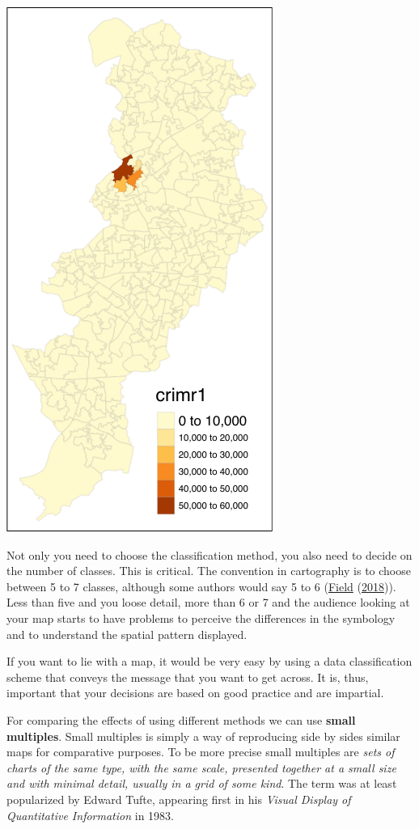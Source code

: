\documentclass[
]{book}
\begin{document}
\includegraphics{crime_mapping_files/figure-latex/unnamed-chunk-86-1.pdf}

Not only you need to choose the classification method, you also need to decide on the number of classes. This is critical. The convention in cartography is to choose between 5 to 7 classes, although some authors would say 5 to 6 (\protect\hyperlink{ref-Field_2018}{Field} (\protect\hyperlink{ref-Field_2018}{2018})). Less than five and you loose detail, more than 6 or 7 and the audience looking at your map starts to have problems to perceive the differences in the symbology and to understand the spatial pattern displayed.

If you want to lie with a map, it would be very easy by using a data classification scheme that conveys the message that you want to get across. It is, thus, important that your decisions are based on good practice and are impartial.

For comparing the effects of using different methods we can use \textbf{small multiples}. Small multiples is simply a way of reproducing side by sides similar maps for comparative purposes. To be more precise small multiples are \emph{sets of charts of the same type, with the same scale, presented together at a small size and with minimal detail, usually in a grid of some kind}. The term was at least popularized by Edward Tufte, appearing first in his \emph{Visual Display of Quantitative Information} in 1983.
\end{document}
